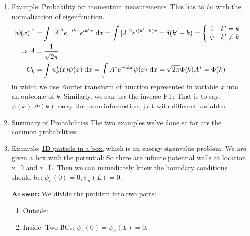 \documentclass{school-22.101-notes}
\begin{document}
\begin{enumerate}
\item \uline{Example: Probability for momentum measurements.} This has to do with the normalization of eigenfunction. 
\begin{align}
|\psi (x)|^2 &= \int |A|^2 e^{-ikx} e^{ik^{\prime}x} \mbox{ }\mathrm{d} x = \int |A|^2 e^{i(k^{\prime}-k)x} = \delta(k^{\prime} - k) = \left\{ \begin{array}{cc}  1 & k^{\prime} = k  \\ 0 &  k^{\prime} \neq k   \end{array} \right. \\
\Rightarrow A &= \frac{1}{\sqrt{2 \pi}}  \\
 C_k &= \int  u_k^*(x) \psi(x) \mbox{ }\mathrm{d} x = \int  A^* e^{-ikx} \psi(x) \mbox{ }\mathrm{d} x = \sqrt{2 \pi} \Phi(k) A^* = \Phi(k)
\end{align}
in which we use Fourier transform of function represented in variable $x$ into an outcome of $k$:
Similarly, we can use the inverse FT:
That is to say, $\psi(x), \Phi(k)$ carry the same information, just with different variables. 


\item \uline{Summary of Probabilities}
The two examples we've done so far are the common probabilities:

\item Example: \uline{1D particle in a box,} which is an energy eigenvalue problem. We are given a box with the potential:
  So there are infinite potential walls at location x=0 and x=L. Then we can immediately know the boundary conditions should be: $\psi_n (0) = 0, \psi_n(L) = 0$. 

  \textbf{Answer:} We divide the problem into two parts:
  \begin{enumerate}
  \item Outside: 
  \item Inside: 
    Two BCs: $\psi_n (0) = \psi_n(L) =0$. 
    

\end{enumerate}
\end{enumerate}
\end{document}
